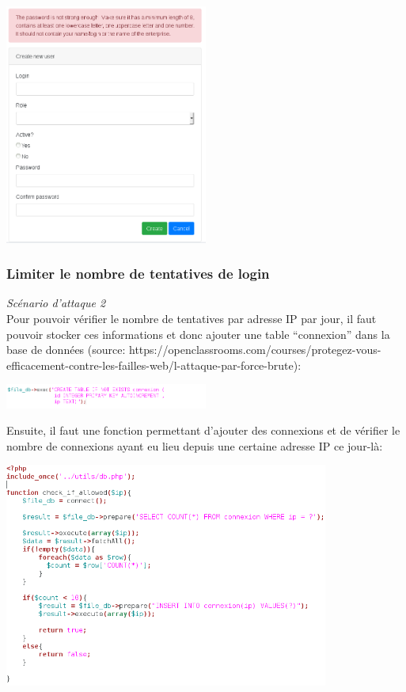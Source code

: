 \documentclass{article}
\begin{document}
\begin{center}\includegraphics[width=0.5\textwidth]{images/password2.PNG}\end{center}

\subsubsection{Limiter le nombre de tentatives de login}

\textit{Scénario d'attaque 2}\\

Pour pouvoir vérifier le nombre de tentatives par adresse IP par jour,
il faut pouvoir stocker ces informations et donc ajouter une table
``connexion'' dans la base de données (source: https://openclassrooms.com/courses/protegez-vous-efficacement-contre-les-failles-web/l-attaque-par-force-brute):

\begin{center}\includegraphics[width=0.5\textwidth]{images/tentative_db.PNG}\end{center}

Ensuite, il faut une fonction permettant d'ajouter des connexions et de
vérifier le nombre de connexions ayant eu lieu depuis une certaine
adresse IP ce jour-là:

\begin{center}\includegraphics[width=0.8\textwidth]{images/tentative_model.PNG}\end{center}
\end{document}
